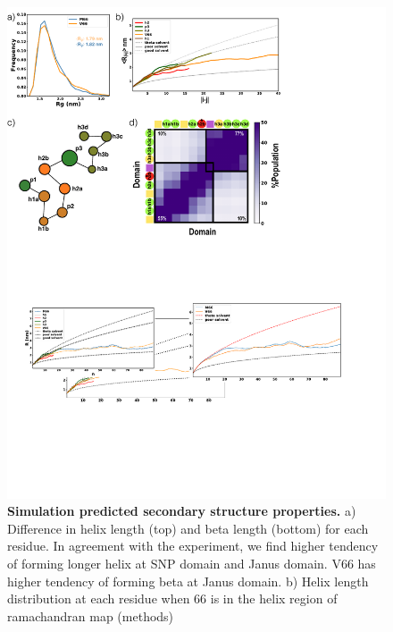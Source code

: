 \documentclass[10pt,letterpaper]{article}
\begin{document}
\begin{figure}[!ht]
\includegraphics[scale=0.5,width=12cm,trim={0 0cm 0 0cm},clip]{../figures/fig3.pdf}

\caption{{\bf Simulation predicted secondary structure properties.}
a) Difference in helix length (top) and beta length (bottom) for each residue. In agreement with the experiment, we find higher tendency of forming longer helix at SNP domain and Janus domain. V66 has higher tendency of forming beta at Janus domain.  b) Helix length distribution at each residue when 66 is in the helix region of ramachandran map (methods) }

\label{fig3} 
\end{figure}
\end{document}
